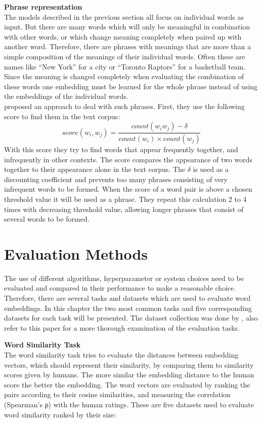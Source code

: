 \documentclass[]{krantz}
\begin{document}
\textbf{Phrase representation}\\
The models described in the previous section all focus on individual words as input. But there are many words which will only be meaningful in combination with other words, or which change meaning completely when paired up with another word. Therefore, there are phrases with meanings that are more than a simple composition of the meanings of their individual words. Often these are names like ``New York'' for a city or ``Toronto Raptors'' for a basketball team. Since the meaning is changed completely when evaluating the combination of these words one embedding must be learned for the whole phrase instead of using the embeddings of the individual words.\\
\citet{Mikolov.2013c} proposed an approach to deal with such phrases. First, they use the following score to find them in the text corpus:
\[score(w_i,w_j) = \frac{count(w_iw_j)-\delta }{count(w_i)\times count(w_j)}\]
With this score they try to find words that appear frequently together, and infrequently in other contexts. The score compares the appearance of two words together to their appearance alone in the text corpus. The \(\delta\) is used as a discounting coefficient and prevents too many phrases consisting of very infrequent words to be formed. When the score of a word pair is above a chosen threshold value it will be used as a phrase. They repeat this calculation 2 to 4 times with decreasing threshold value, allowing longer phrases that consist of several words to be formed.

\hypertarget{evaluation-methods}{%
\section{Evaluation Methods}\label{evaluation-methods}}

The use of different algorithms, hyperparameter or system choices need to be evaluated and compared in their performance to make a reasonable choice. Therefore, there are several tasks and datasets which are used to evaluate word embeddings. In this chapter the two most common tasks and five corresponding datasets for each task will be presented. The dataset collection was done by \citet{bakarov2018survey}, also refer to this paper for a more thorough examination of the evaluation tasks.

\textbf{Word Similarity Task}\\
The word similarity task tries to evaluate the distances between embedding vectors, which should represent their similarity, by comparing them to similarity scores given by humans. The more similar the embedding distance to the human score the better the embedding. The word vectors are evaluated by ranking the pairs according to their cosine similarities, and measuring the correlation (Spearman's ρ) with the human ratings. These are five datasets used to evaluate word similarity ranked by their size:
\end{document}
